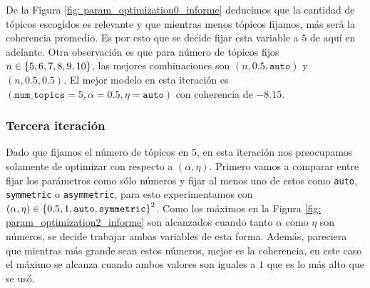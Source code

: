 \documentclass{article}
\begin{document}
 	De la Figura \ref{fig: param_optimization0_informe} deducimos que la cantidad de tópicos escogidos es relevante y que mientras menos tópicos fijamos, más será la coherencia promedio. Es por esto que se decide fijar esta variable a $5$ de aquí en adelante. Otra observación es que para número de tópicos fijos $n\in\left\{5,6,7,8,9,10\right\}$, las mejores combinaciones son $(n, 0.5, \texttt{auto})$ y $(n, 0.5, 0.5)$. El mejor modelo en esta iteración es $(\texttt{num\_topics}=5,\alpha= 0.5, \eta=\texttt{auto})$ con coherencia de $-8.15$.
 	
 	\subsubsection{Tercera iteración}
	Dado que fijamos el número de tópicos en $5$, en esta iteración nos preocupamos solamente de optimizar con respecto a $(\alpha, \eta)$. Primero vamos a comparar entre fijar los parámetros como sólo números y fijar al menos uno de estos como \texttt{auto}, \texttt{symmetric} o \texttt{asymmetric}, para esto experimentamos con $(\alpha, \eta)\in\left\{0.5, 1,\texttt{auto}, \texttt{symmetric}\right\}^2$. Como los máximos en la Figura \ref{fig: param_optimization2_informe} son alcanzados cuando tanto $\alpha$ como $\eta$ son números, se decide trabajar ambas variables de esta forma. Además, pareciera que mientras más grande sean estos números, mejor es la coherencia, en este caso el máximo se alcanza cuando ambos valores son iguales a $1$ que es lo más alto que se usó.
	
\end{document}
